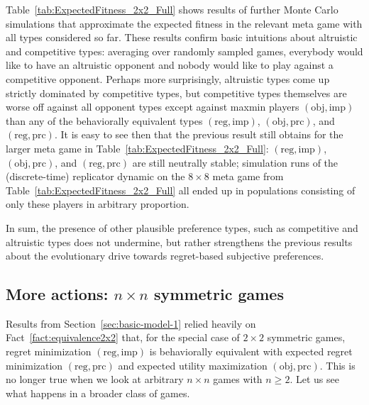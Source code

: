 \documentclass[fleqn,reqno,11pt]{article}
\newcommand{\myalert}[1]{\textcolor{red}{#1}}
\begin{document}
Table~\ref{tab:ExpectedFitness_2x2_Full} shows results of further Monte Carlo simulations that
approximate the expected fitness in the relevant meta game with all types considered so
far. These results confirm basic intuitions about altruistic and competitive types: averaging
over randomly sampled games, everybody would like to have an altruistic opponent and nobody
would like to play against a competitive opponent. Perhaps more surprisingly, altruistic types
come up strictly dominated by competitive types, but competitive types themselves are worse off
against all opponent types except against maxmin players $(\text{obj}, \text{imp})$ than any of
the behaviorally equivalent types $(\text{reg}, \text{imp})$, $(\text{obj}, \text{prc})$, and
$(\text{reg}, \text{prc})$.  \iffalse This is a noteworthy results in the light of the fact
that evolving altruistic preferences have been shown to support cooperative behavior in a
single stage game \myalert{[CITE]}. In contrast, averaging over payoffs in multiple stage
games, like we do here, makes altruistic preferences prime victims of evolutionary eradication.
\fi It is easy to see then that the previous result still obtains for the larger meta game in
Table~\ref{tab:ExpectedFitness_2x2_Full}: $(\text{reg}, \text{imp})$,
$(\text{obj}, \text{prc})$, and $(\text{reg}, \text{prc})$ are still neutrally stable;
simulation runs of the (discrete-time) replicator dynamic on the $8 \times 8$ meta game from
Table~\ref{tab:ExpectedFitness_2x2_Full} all ended up in populations consisting of only these
players in arbitrary proportion.

In sum, the presence of other plausible preference types, such as competitive and altruistic
types does not undermine, but rather strengthens the previous results about the evolutionary
drive towards regret-based subjective preferences.


                                   
\subsection{More actions: $n \times n$ symmetric games}
\label{sec:n-times-n}

Results from Section~\ref{sec:basic-model-1} relied heavily on Fact~\ref{fact:equivalence2x2}
that, for the special case of $2 \times 2$ symmetric games, regret minimization
$(\text{reg}, \text{imp})$ is behaviorally equivalent with expected regret minimization
$(\text{reg}, \text{prc})$ and expected utility maximization $(\text{obj}, \text{prc})$. This
is no longer true when we look at arbitrary $n \times n$ games with $n \ge 2$. Let us see what
happens in a broader class of games.
\end{document}
